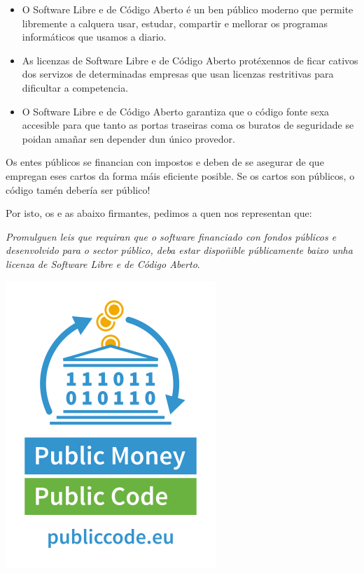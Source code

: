 \documentclass[10pt,foldmark,tumble]{leaflet}
\begin{document}
\begin{itemize}
    \item O Software Libre e de Código Aberto é un ben público moderno que permite libremente a calquera usar, estudar, compartir e mellorar os programas informáticos que usamos a diario.
    \item As licenzas de Software Libre e de Código Aberto protéxennos de ficar cativos dos servizos de determinadas empresas que usan licenzas restritivas para dificultar a competencia.
    \item O Software Libre e de Código Aberto garantiza que o código fonte sexa accesible para que tanto as portas traseiras coma os buratos de seguridade se poidan amañar sen depender dun único provedor.
\end{itemize}


    Os entes públicos se financian con impostos e deben de se asegurar de que empregan eses cartos da forma máis eficiente posible. Se os cartos son públicos, o código tamén debería ser público!

    Por isto, os e as abaixo firmantes, pedimos a quen nos representan que:

    \emph{Promulguen leis que requiran que o software financiado con fondos públicos e desenvolvido para o sector público, deba estar dispoñible públicamente baixo unha licenza de Software Libre e de Código Aberto}.


\newpage

\vspace{15em}


\includegraphics[scale=1.6]{pmpc.png}
\end{document}
